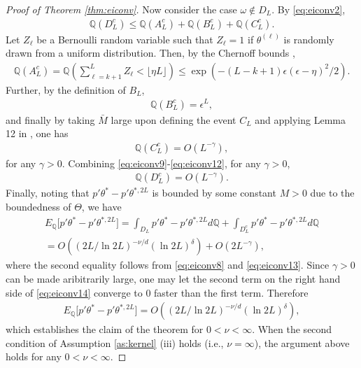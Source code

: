 \documentclass[letterpaper,11pt]{article}
\theoremstyle{myplain}
\theoremstyle{mydefinition}
\theoremstyle{myremark}
\renewcommand{\cite}{\citet}
\newcommand{\bQ}{\mathbb Q}
\numberwithin{equation}{section}
\numberwithin{figure}{section}
\begin{document}
\begin{appendix}
\begin{proof}[Proof of Theorem \ref{thm:eiconv}]
Now consider the case $\omega\notin D_L$. By \eqref{eq:eiconv2},
\begin{align}
\bQ(D_L^c)\le \bQ(A^c_L)+\bQ(B^c_L)+\bQ(C^c_L).\label{eq:eiconv9}
\end{align}
Let $Z_\ell$ be a Bernoulli random variable such that $Z_\ell=1$ if $\theta^{(\ell)}$ is randomly drawn from a uniform distribution.
Then, by the Chernoff bounds \citep[see e.g.][p.48]{boucheron2013concentration},
\begin{align}
	\bQ(A^c_L)=\bQ(\sum_{\ell=k+1}^LZ_\ell< \lfloor \eta L\rfloor)\le \exp(-(L-k+1)\epsilon(\epsilon-\eta)^2/2).\label{eq:eiconv10}
\end{align}
Further, by the definition of $B_L$,
\begin{align}
\bQ(B^c_L)	=\epsilon^L,\label{eq:eiconv11}
\end{align}
and finally by taking $\bar M$ large upon defining the event $C_L$ and applying Lemma 12 in \cite{Bull_Convergence_2011},
one has
\begin{align}
\bQ(C^c_L) =O(L^{-\gamma}),	\label{eq:eiconv12}
\end{align}
for any $\gamma>0$. Combining \eqref{eq:eiconv9}-\eqref{eq:eiconv12}, for any $\gamma>0$,
\begin{align}
\bQ(D^c_L)=	O(L^{-\gamma}).\label{eq:eiconv13}
\end{align}
Finally, noting that $p'\theta^*-p'\theta^{*,2L}$ is bounded by some constant $M>0$ due to the boundedness of $\Theta$, we have
\begin{multline}
E_{\bQ}\big[p'\theta^*-p'\theta^{*,2L}\big]=\int_{D_L}	p'\theta^*-p'\theta^{*,2L}d\bQ+\int_{D_L^c}p'\theta^*-p'\theta^{*,2L}d\bQ\\
= O((2L/\ln 2L)^{-\nu/d}(\ln 2L)^\delta)+O(2L^{-\gamma}),\label{eq:eiconv14}
\end{multline}
where the second equality follows from \eqref{eq:eiconv8} and \eqref{eq:eiconv13}. Since $\gamma>0$ can be made aribitrarily large, one may let the second term on the right hand side of \eqref{eq:eiconv14} converge to 0 faster than the first term. Therefore
\begin{align}
	E_{\bQ}\big[p'\theta^*-p'\theta^{*,2L}\big]= O((2L/\ln 2L)^{-\nu/d}(\ln 2L)^\delta),
\end{align}
which establishes the claim of the theorem for $0<\nu<\infty$. When the second condition of Assumption \ref{as:kernel} (iii) holds (i.e.,  $\nu=\infty$), the argument above holds for any $0<\nu<\infty.$
\end{proof}



\end{appendix}
\end{document}
